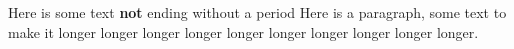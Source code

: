 Here is some text \textbf{not} ending without a period	    Here is a
paragraph, some text to make it longer longer longer longer longer longer
longer longer longer longer.
